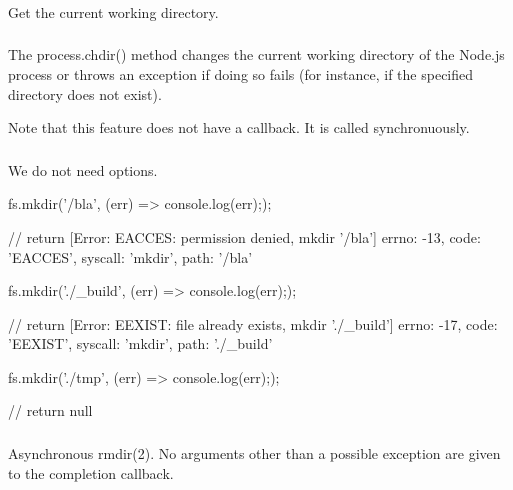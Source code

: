 \subsubsection{}

Get the current working directory.

\subsubsection{}

The process.chdir() method changes the current working directory of the
Node.js process or throws an exception if doing so fails (for instance, if the
specified directory does not exist).

Note that this feature does not have a callback. It is called synchronuously.

\subsubsection{}

We do not need options.

\begin{js}
  fs.mkdir('/bla', (err) => {console.log(err);});

  // return
  { [Error: EACCES: permission denied, mkdir '/bla']
    errno: -13,
    code: 'EACCES',
    syscall: 'mkdir',
    path: '/bla' }
\end{js}


\begin{js}
  fs.mkdir('./_build', (err) => {console.log(err);});

  // return
  { [Error: EEXIST: file already exists, mkdir './_build']
    errno: -17,
    code: 'EEXIST',
    syscall: 'mkdir',
    path: './_build' }
\end{js}

\begin{js}
  fs.mkdir('./tmp', (err) => {console.log(err);});

  // return
  null
\end{js}




\subsubsection{}

Asynchronous rmdir(2). No arguments other than a possible exception are given
to the completion callback.

